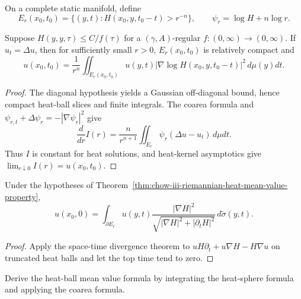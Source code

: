 On a complete static manifold, define
\[
 E_r(x_0,t_0)=\{(y,t):H(x_0,y,t_0-t)>r^{-n}\},
 \qquad \psi_r=\log H+n\log r.
\]

\begin{theorem}
\label{thm:chow-iii-riemannian-heat-mean-value-property}


Suppose \(H(y,y,\tau)\le C/f(\tau)\) for a \((\gamma,A)\)-regular
\(f:(0,\infty)\to(0,\infty)\).  If \(u_t=\Delta u\), then for sufficiently
small \(r>0\), \(E_r(x_0,t_0)\) is relatively compact and
\[
 u(x_0,t_0)=\frac1{r^n}\iint_{E_r(x_0,t_0)}u(y,t)
 |\nabla\log H(x_0,y,t_0-t)|^2\,d\mu(y)dt.
\]
\end{theorem}
\begin{proof}
\sketch The diagonal hypothesis yields a Gaussian off-diagonal bound, hence compact
heat-ball slices and finite integrals.  The coarea formula and
\(\psi_{r,t}+\Delta\psi_r=-|\nabla\psi_r|^2\) give
\[
 \frac d{dr}I(r)=\frac n{r^{n+1}}\iint_{E_r}\psi_r(\Delta u-u_t)\,d\mu dt.
\]
Thus \(I\) is constant for heat solutions, and heat-kernel asymptotics give
\(\lim_{r\downarrow0}I(r)=u(x_0,t_0)\).
\end{proof}

\begin{theorem}
\label{thm:chow-iii-heat-sphere-mean-value-property}


Under the hypotheses of Theorem~\ref{thm:chow-iii-riemannian-heat-mean-value-property},
\[
 u(x_0,0)=\int_{\partial E_r}u(y,t)
 \frac{|\nabla H|^2}{\sqrt{|\nabla H|^2+|\partial_tH|^2}}
 \,d\widetilde\sigma(y,t).
\]
\end{theorem}
\begin{proof}
\sketch Apply the space-time divergence theorem to
\(uH\partial_t+u\nabla H-H\nabla u\) on truncated heat balls and let the
top time tend to zero.
\end{proof}

\begin{claim}
\label{clm:chow-iii-heat-sphere-coarea-exercise}


Derive the heat-ball mean value formula by integrating the heat-sphere formula
and applying the coarea formula.
\end{claim}

